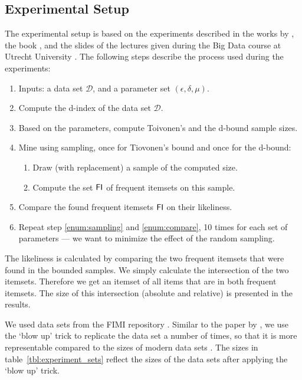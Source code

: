\documentclass[../main.tex]{subfiles}
\begin{document}
\subsection{Experimental Setup}
\label{sec:II_setup}

The experimental setup is based on the experiments described in the works by \citeauthor{Riondato2015} \cite{Riondato2015},
the book  \cite{Leskovec2014mining},
and the slides of the lectures given during the Big Data course at Utrecht University \cite{Siebes2017fim}.
The following steps describe the process used during the experiments:
\begin{enumerate}[noitemsep]
    \item Inputs: a data set $\mathcal{D}$, and a parameter set $(\epsilon, \delta, \mu)$.
    \item Compute the d-index of the data set $\mathcal{D}$.
    \item Based on the parameters, compute Toivonen's and the d-bound sample sizes.
    \item \label{enum:sampling} Mine using sampling, once for Tiovonen's bound and once for the d-bound:
        \begin{enumerate}[noitemsep]
            \item Draw (with replacement) a sample of the computed size.
            \item Compute the set $\mathsf{FI}$ of frequent itemsets on this sample.
        \end{enumerate}
    \item \label{enum:compare} Compare the found frequent itemsets $\mathsf{FI}$ on their likeliness.
    \item Repeat step \ref{enum:sampling} and \ref{enum:compare}, 10 times for each set of parameters --- we want to minimize the effect of the random sampling.
\end{enumerate}

The likeliness is calculated by comparing the two frequent itemsets that were found in the bounded samples.
We simply calculate the intersection of the two itemsets.
Therefore we get an itemset of all items that are in both frequent itemsets.
The size of this intersection (absolute and relative) is presented in the results.


We used data sets from the FIMI repository \cite{FIMI2003}.
Similar to the paper by \citeauthor{Riondato2015}, we use the `blow up' trick to replicate the data set a number of times,
so that it is more representable compared to the sizes of modern data sets \cite[Section~5]{Riondato2015}.
The sizes in table~\ref{tbl:experiment_sets} reflect the sizes of the data sets after applying the `blow up' trick.
\end{document}

